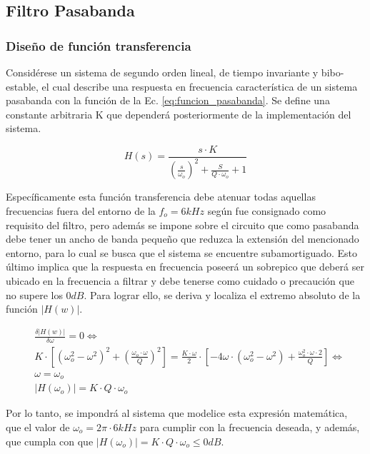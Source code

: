 \subsection{Filtro Pasabanda}
\subsubsection{Dise\~no de funci\'on transferencia}
Consid\'erese un sistema de segundo orden lineal, de tiempo invariante y bibo-estable, el cual describe una respuesta en frecuencia caracter\'istica 
de un sistema pasabanda con la funci\'on de la Ec. \ref{eq:funcion_pasabanda}. Se define una constante arbitraria K que depender\'a posteriormente de la implementaci\'on del sistema.

\begin{equation}
    H(s) = \frac{s \cdot K}{\left( \frac{s}{\omega_o} \right)^{2} + \frac{S}{Q \cdot \omega_o} + 1}    
    \label{eq:funcion_pasabanda}
\end{equation}

Espec\'ificamente esta funci\'on transferencia debe atenuar todas aquellas frecuencias fuera del entorno de la $f_o = 6kHz$ seg\'un fue consignado como requisito del filtro, pero adem\'as se impone sobre el circuito
que como pasabanda debe tener un ancho de banda peque\~no que reduzca la extensi\'on del mencionado entorno, para lo cual se busca que el sistema se encuentre subamortiguado. Esto \'ultimo implica que la respuesta en frecuencia poseer\'a
un sobrepico que deber\'a ser ubicado en la frecuencia a filtrar y debe tenerse como cuidado o precauci\'on que no supere los $0dB$. Para lograr ello, se deriva y localiza el extremo absoluto de la funci\'on $|H(w)|$.

\begin{align*}
    & \frac{\delta |H(w)|}{\delta \omega} = 0 \Leftrightarrow \\
    & K \cdot \left[ (\omega_o^{2} - \omega^{2})^{2} + (\frac{\omega_o \cdot \omega}{Q})^{2} \right]
    = \frac{K \cdot \omega}{2} \cdot \left[ -4 \omega \cdot ( \omega_o^{2} - \omega^{2}) + \frac{\omega_o^{2} \cdot \omega \cdot 2}{Q} \right] \Leftrightarrow \\
    & \omega = \omega_o \\
    & |H(\omega_o)| = K \cdot Q \cdot \omega_o
\end{align*}

Por lo tanto, se impondr\'a al sistema que modelice esta expresi\'on matem\'atica, que el valor de $\omega_o = 2\pi \cdot 6kHz$ para cumplir con la frecuencia deseada, y adem\'as,
que cumpla con que $|H(\omega_o)| = K \cdot Q \cdot \omega_o \leq 0dB$.

